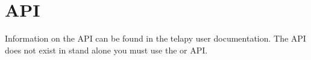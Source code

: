 \chapter{API}

Information on the \waqtel API can be found in the telapy user documentation.
The \waqtel API does not exist in stand alone you must use the  or
 API.
